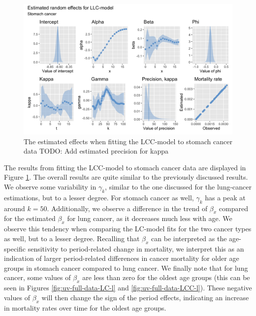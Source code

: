 \begin{figure}[h!]
    \centering
    \includegraphics[width=0.85\linewidth]{real-data/real-data-univariate/Figures/uv-full-data-lcc-s.png}
    \caption{The estimated effects when fitting the LCC-model to stomach cancer data \textcolor{myDarkBlue}{TODO: Add estimated precision for kappa}}
    \label{fig:uv-full-data-LCC-s}
\end{figure}

\newpar The results from fitting the LCC-model to stomach cancer data are displayed in Figure \ref{fig:uv-full-data-LCC-s}. The overall results are quite similar to the previously discussed results. We observe some variability in $\gamma_k$, similar to the one discussed for the lung-cancer estimations, but to a lesser degree. For stomach cancer as well, $\gamma_k$ has a peak at around $k = 50$. Additionally, we observe a difference in the trend of $\beta_x$ compared for the estimated $\beta_x$ for lung cancer, as it decreases much less with age. We observe this tendency when comparing the LC-model fits for the two cancer types as well, but to a lesser degree. Recalling that $\beta_x$ can be interpreted as the age-specific sensitivity to period-related change in mortality, we interpret this as an indication of larger period-related differences in cancer mortality for older age groups in stomach cancer compared to lung cancer. We finally note that for lung cancer, some values of $\beta_x$ are less than zero for the oldest age groups (this can be seen in Figures \ref{fig:uv-full-data-LC-l} and \ref{fig:uv-full-data-LCC-l}). These negative values of $\beta_x$ will then change the sign of the period effects, indicating an increase in mortality rates over time for the oldest age groups. 


